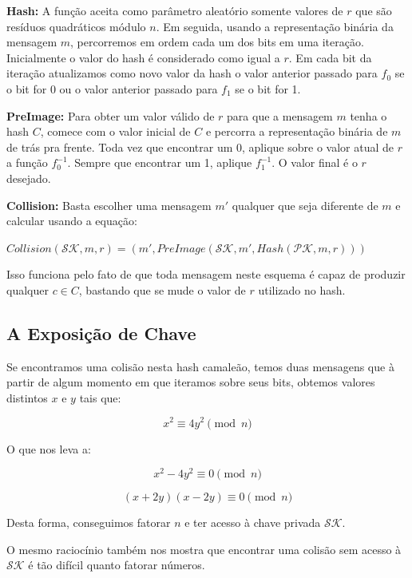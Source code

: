 \documentclass[a4paper]{article}
\begin{document}
 \textbf{Hash:} A função aceita como parâmetro aleatório somente
 valores de $r$ que são resíduos quadráticos módulo $n$. Em seguida,
 usando a representação binária da mensagem $m$, percorremos em ordem
 cada um dos bits em uma iteração. Inicialmente o valor do hash é
 considerado como igual a $r$. Em cada bit da iteração atualizamos como
 novo valor da hash o valor anterior passado para $f_0$ se o bit for 0
 ou o valor anterior passado para $f_1$ se o bit for 1.
 
 \textbf{PreImage:} Para obter um valor válido de $r$ para que a
 mensagem $m$ tenha o hash $C$, comece com o valor inicial de $C$ e
 percorra a representação binária de $m$ de trás pra frente. Toda vez
 que encontrar um 0, aplique sobre o valor atual de $r$ a função
 $f_0^{-1}$. Sempre que encontrar um 1, aplique $f_1^{-1}$. O valor
 final é o $r$ desejado.
 
 \textbf{Collision:} Basta escolher uma mensagem $m'$ qualquer que seja
 diferente de $m$ e calcular usando a equação:
 
 $Collision(\mathcal{SK}, m, r) = (m', PreImage(\mathcal{SK}, m',
 Hash(\mathcal{PK}, m, r)))$
 
 Isso funciona pelo fato de que toda mensagem neste esquema é capaz de
 produzir qualquer $c \in C$, bastando que se mude o valor de $r$
 utilizado no hash.
 
 \subsection{A Exposição de Chave}
 
 Se encontramos uma colisão nesta hash camaleão, temos duas mensagens
 que à partir de algum momento em que iteramos sobre seus bits, obtemos
 valores distintos $x$ e $y$ tais que:
 
 $$
 x^2 \equiv 4y^2 \pmod n
 $$
 
 O que nos leva a:
 
 $$
 x^2 - 4y^2 \equiv 0 \pmod n
 $$
 
 $$
 (x+2y)(x-2y) \equiv 0 \pmod n
 $$
 
 Desta forma, conseguimos fatorar $n$ e ter acesso à chave privada
 $\mathcal{SK}$.
 
 O mesmo raciocínio também nos mostra que encontrar uma colisão sem
 acesso à $\mathcal{SK}$ é tão difícil quanto fatorar números.
 
 
\end{document}

